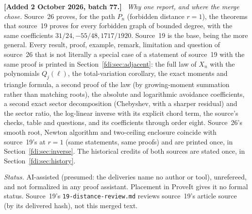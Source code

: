 \documentclass[11pt,letterpaper]{article}
\theoremstyle{remark}\newtheorem{remark}[theorem]{Remark}
\newenvironment{mergenote}[1][2 October 2026, batch 77]{\par\smallskip\begingroup\small\noindent\textbf{[Added #1.]}\ }{\endgroup\par\smallskip}
\begin{document}
\begin{mergenote}
\emph{Why one report, and where the merge chose.} Source~26 proves, for the path $P_n$ (forbidden distance $r=1$), the theorems that source~19 proves for every forbidden graph of bounded degree, with the same coefficients $31/24,-55/48,1717/1920$. Source~19 is the base, being the more general. Every result, proof, example, remark, limitation and question of source~26 that is not literally a special case of a statement of source~19 with the same proof is printed in Section~\ref{fdi:sec:adjacent}: the full law of $X_n$ with the polynomials $Q_j(\ell)$, the total-variation corollary, the exact moments and triangle formula, a second proof of the law (by growing-moment summation rather than matching roots), the absolute and logarithmic avoidance coefficients, a second exact sector decomposition (Chebyshev, with a sharper residual) and the sector ratio, the log-linear inverse with its explicit chord term, the source's checks, table and questions, and its coefficients through order eight. Source~26's smooth root, Newton algorithm and two-ceiling enclosure coincide with source~19's at $r=1$ (same statements, same proofs) and are printed once, in Section~\ref{fdi:sec:inverse}. The historical credits of both sources are stated once, in Section~\ref{fdi:sec:history}.

\emph{Status.} AI-assisted (presumed: the deliveries name no author or tool), unrefereed, and not formalized in any proof assistant. Placement in ProveIt gives it no formal status. Source~19's \texttt{19-distance-review.md} reviews source~19's article source (by its delivered hash), not this merged text.


\end{mergenote}
\end{document}
